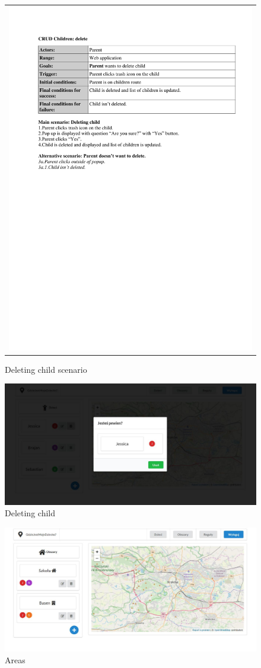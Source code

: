 \documentclass{sprawozdanie-agh}
\begin{document}
		\begin{figure}[H] 
			\centering
			\begin{tabular}{c}
				\includegraphics[width=.80\textwidth]{childrenDelete} 
			\end{tabular} 
		\caption{Deleting child scenario}
		\end{figure}

		\begin{figure}[H]
			\centering
			\includegraphics[width=.80\textwidth]{deleteChild}
			\caption{Deleting child}
		\end{figure}

		\begin{figure}[H]
			\centering
			\includegraphics[width=.80\textwidth]{areas}
			\caption{Areas}
		\end{figure}
\end{document}
